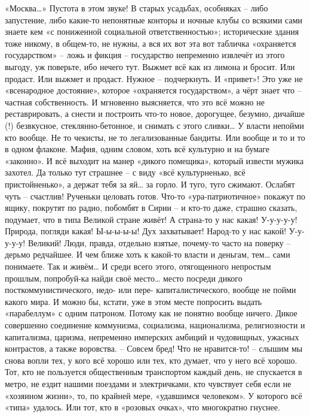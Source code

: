 «Москва…» Пустота в этом звуке! В старых усадьбах, особняках – либо запустение, либо какие-то непонятные конторы и ночные клубы со всякими сами знаете кем «с пониженной социальной ответственностью»; исторические здания тоже никому, в общем-то, не нужны, а вся их вот эта вот табличка «охраняется государством» – ложь и фикция – государство непременно извлечёт из этого выгоду, уж поверьте, ибо нечего тут. Выжмет всё как из лимона и бросит. Или продаст. Или выжмет и продаст. Нужное – подчеркнуть. И «привет»! Это уже не «всенародное достояние», которое «охраняется государством», а чёрт знает что –  частная собственность. И мгновенно выясняется, что это всё можно не реставрировать, а снести и построить что-то новое, дорогущее, безумно, дичайше (!) безвкусное, стеклянно-бетонное, и снимать с этого сливки… 
У власти непойми кто вообще. Не то чекисты, не то легализованные бандиты. Или вообще и то и то в одном флаконе. Мафия, одним словом, хоть всё культурно и на бумаге «законно». И всё выходит на манер «дикого помещика», который извести мужика захотел. Да только тут страшнее – с виду «всё культурненько, всё пристойненько», а держат тебя за яй… за горло. И туго, туго сжимают. Ослабят чуть – счастлив! Рученьки целовать готов. Что-то «ура-патриотичное» покажут по ящику, покрутят по радио, побомбят в Сирии – и кто-то даже, страшно сказать, подумает, что в типа Великой стране живёт! А страна-то у нас какая! У-у-у-у-у! Природа, погляди какая! Ы-ы-ы-ы-ы! Дух захватывает! Народ-то у нас какой! У-у-у-у-у! Великий! Люди, правда, отдельно взятые, почему-то часто на поверку – дерьмо редчайшее. И чем ближе хоть к какой-то власти и деньгам, тем… сами понимаете. Так и живём…
И среди всего этого, отягощенного непростым прошлым, попробуй-ка найди своё место… место посреди дикого посткоммунистического, недо- или пере- капиталистического, вообще не пойми какого мира. И можно бы, кстати, уже в этом месте попросить выдать «парабеллум» с одним патроном. Потому как не понятно вообще ничего. Дикое совершенно соединение коммунизма, социализма, национализма, религиозности и капитализма, царизма, непременно имперских амбиций и чудовищных, ужасных контрастов, а также воровства. 
– Совсем бред! Что не нравится-то! – слышим мы снова вопли тех, у кого всё хорошо или тех, кто думает, что у него всё хорошо. Тот, кто не пользуется общественным транспортом каждый день, не спускается в метро, не ездит нашими поездами и электричками, кто чувствует себя если не «хозяином жизни», то, по крайней мере, «удавшимся человеком». У которого всё «типа» удалось. Или тот, кто в «розовых очках», что многократно гнуснее.

